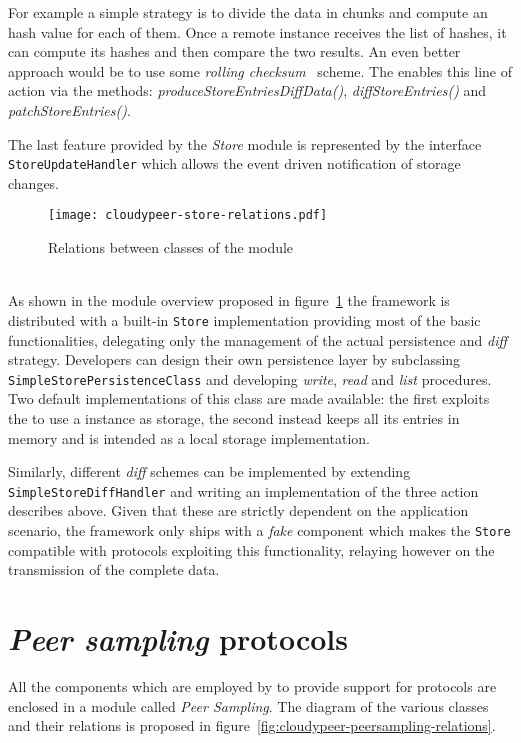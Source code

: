 For example a simple strategy is to divide the data in chunks and
compute an hash value for each of them. Once a remote instance receives
the list of hashes, it can compute its hashes and then
compare the two results. An even better approach would be to use some
\textit{rolling  checksum}~\cite{Rsync} scheme.
The \api enables this line of action via the methods:
\textit{produceStoreEntriesDiffData()}, \textit{diffStoreEntries()} and
\textit{patchStoreEntries()}.

The last feature provided by the \textit{Store} module is represented
by the interface \texttt{StoreUpdateHandler} which allows the event
driven notification of storage changes.

\begin{figure}[h!]
  \centering
  \texttt{[image: cloudypeer-store-relations.pdf]}
  \caption{Relations between classes of the \cloudhelper module}
  \label{fig:cloudypeer-store-relations}
\end{figure}

\ \\
As shown in the module overview proposed in
figure~\ref{fig:cloudypeer-store-relations} the framework is
distributed with a built-in \texttt{Store} implementation providing
most of the basic functionalities, delegating only the management of the
actual persistence and \textit{diff} strategy. Developers can design their
own persistence layer by subclassing
\texttt{Simple\-Store\-Persistence\-Class} and developing \textit{write}, \textit{read} and
\textit{list} procedures. Two default implementations of this class are
made available: the first exploits the \cloudhelper to use a \cloud
instance as storage, the second instead keeps all its entries in
memory and is intended as a local storage implementation.

Similarly, different \textit{diff} schemes can be implemented by
extending \texttt{Simple\-Store\-Diff\-Handler} and writing
an implementation of the three action describes above. Given that
these are strictly dependent on the application scenario, the
framework only ships with a \textit{fake} component which makes the
\texttt{Store} compatible with protocols exploiting this
functionality, relaying however on the transmission of the complete data.

\section{\emph{Peer sampling} protocols}
All the components which are employed by \cloudypeer to provide
support for \peersampling protocols are enclosed in a module called
\textit{Peer Sampling}. The diagram of the various classes and their
relations is proposed in figure~\ref{fig:cloudypeer-peersampling-relations}.

